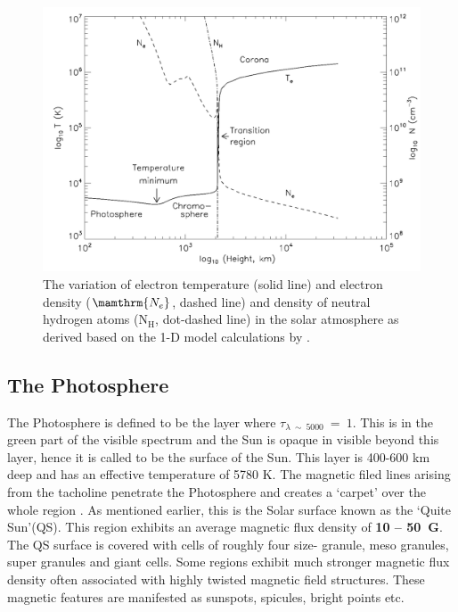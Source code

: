\begin{figure}[ht!]
    \centering
    \includegraphics[width = 0.8\linewidth]{Figures/solar_atm.png}
    \caption{The variation of electron temperature (solid line) and electron density ($\mamthrm{N_{e}}$, dashed line) and density of neutral hydrogen atoms ($\mathrm{N_{H}}$, dot-dashed line) in the solar atmosphere as derived based on the 1-D model calculations by .}
    \label{fig_solar_atm}
\end{figure}

\subsection{The Photosphere}\label{photosphere}

The Photosphere is defined to be the layer where $\tau_{\lambda~\sim~5000}~=~1$. This is in the green part of the visible spectrum and the Sun is opaque in visible beyond this layer, hence it is called to be the surface of the Sun. This layer is 400-600 km deep and has an effective temperature of 5780 K. The magnetic filed lines arising from the tacholine penetrate the Photosphere and creates a `carpet' over the whole region \citep{priest14}. As mentioned earlier, this is the Solar surface known as the `Quite Sun'(QS). This region exhibits an average magnetic flux density of \textbf{10 -- 50~G}. The QS surface is covered with cells of roughly four size- granule, meso granules, super granules and giant cells. Some regions exhibit much stronger magnetic flux density often associated with highly twisted magnetic field structures. These magnetic features are manifested as sunspots, spicules, bright points etc. 

